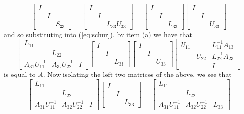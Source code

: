 \documentclass{../../../kin_math}
\begin{document}
\begin{questions}
\begin{enumerate}
\begin{solution}
\begin{equation*}
        \begin{bmatrix} I & & \\ & I & \\ & & S_{33} \end{bmatrix} = \begin{bmatrix} I & & \\ & I & \\ & & L_{33} U_{33} \end{bmatrix} = \begin{bmatrix} I & & \\ & I & \\ & & L_{33} \end{bmatrix} \begin{bmatrix} I & & \\ & I & \\ & & U_{33} \end{bmatrix}
      \end{equation*}
      and so substituting into (\ref{eq:schur}), by item (a) we have that
      \begin{equation*}
        \begin{bmatrix} L_{11} & & \\ & L_{22} & \\ A_{31} U_{11}^{-1} & A_{32} U_{22}^{-1} & I \end{bmatrix} \begin{bmatrix} I & & \\ & I & \\ & & L_{33} \end{bmatrix} \begin{bmatrix} I & & \\ & I & \\ & & U_{33} \end{bmatrix} \begin{bmatrix} U_{11} & & L_{11}^{-1} A_{13} \\ & U_{22} & L_{22}^{-1} A_{23} \\ & & I \end{bmatrix}
      \end{equation*}
      is equal to $A$. Now isolating the left two matrices of the above, we see that
      \begin{equation*}
        \begin{bmatrix} L_{11} & & \\ & L_{22} & \\ A_{31} U_{11}^{-1} & A_{32} U_{22}^{-1} & I \end{bmatrix} \begin{bmatrix} I & & \\ & I & \\ & & L_{33} \end{bmatrix} = \begin{bmatrix} L_{11} & & \\ & L_{22} & \\ A_{31} U_{11}^{-1} & A_{32} U_{22}^{-1} & L_{33} \end{bmatrix}

\end{equation*}
\end{solution}
\end{enumerate}
\end{questions}
\end{document}
